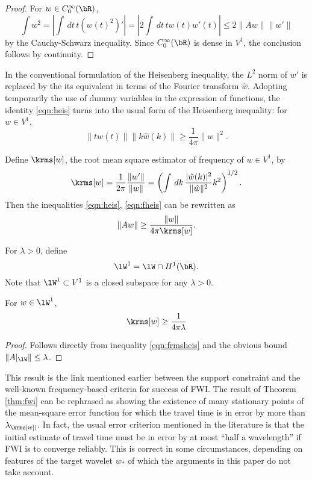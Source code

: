 \begin{proof}
  For $w \in C_0^{\infty}(\bR)$,
  \[
    \int w^2 = \left|\int\,dt\, t (w(t)^2)' \right|= \left|2\int\,dt\,tw(t)w'(t)\right| \le
    2\|Aw\| \|w'\|
  \]
  by the Cauchy-Schwarz inequality. Since $C_0^{\infty}(\bR)$ is dense
  in $V^1$, the conclusion follows by continuity.
\end{proof}

In the conventional formulation of the Heisenberg inequality, the $L^2$ norm of
$w'$ is replaced by the its equivalent in terms of the Fourier
transform $\hat{w}$. Adopting temporarily the use of dummy variables
in the expression of functions, the identity \ref{eqn:heis} turns into
the usual form of the Heisenberg inequality: for $w \in V^1$,
\begin{equation}
\label{eqn:fheis}
\|tw(t)\|\|k\hat{w}(k)\| \ge \frac{1}{4\pi}\|w\|^2.
\end{equation}

Define $\krms[w]$, the root mean square estimator of frequency of $w
\in V^1$, by
\begin{equation}
  \label{eqn:krms}
  \krms[w]=\frac{1}{2\pi}\frac{\|w'\|}{\|w\|} = \left(\int
    \,dk\,\frac{|\hat{w}(k)|^2}{\|\hat{w}\|^2} k^2\right)^{1/2}.
\end{equation}
Then the inequalities \ref{eqn:heis}, \ref{eqn:fheis} can be rewritten as
\begin{equation}
  \label{eqn:frmsheis}
  \|Aw\| \ge \frac{\|w\|}{4\pi \krms[w]}.
\end{equation}

For $\lambda >0$, define
\begin{equation}
  \label{eqn:wlam1}
  \lW^1 = \lW \cap H^1(\bR).
\end{equation}
Note that $\lW^1 \subset V^1$ is a closed subspace for any
$\lambda>0$.

\begin{proposition}
  \label{thm:klam}
  For $w \in \lW^1$,
  \[
    \krms[w] \ge \frac{1}{4 \pi \lambda}
  \]
\end{proposition}

\begin{proof}
  Follows directly from inequality \ref{eqn:frmsheis} and the obvious bound
  $\|A|_{\lW}\|\le \lambda$.
\end{proof}

 This result is the link mentioned earlier between the support
constraint and the well-known frequency-based criteria for success of
FWI. The result of Theorem \ref{thm:fwi} can be rephrased as showing the
existence of many stationary points of the mean-square error function
for which the travel time is in error by more than
$\lambda_{\krms[w]|}$. In fact, the usual error criterion mentioned in the
literature is that the initial estimate of travel time must be in error by at most ``half a
wavelength'' if FWI is to converge reliably. This is correct in some
circumstances, depending on features of the target wavelet $w_*$ of
which the arguments in this paper do not take account.

